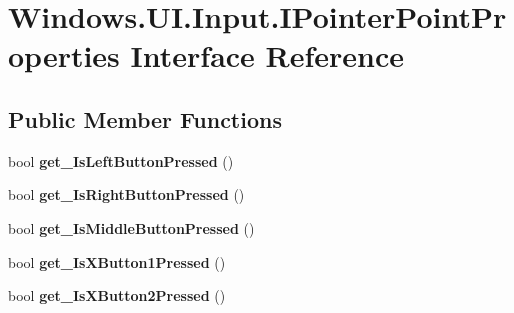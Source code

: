 \hypertarget{interface_windows_1_1_u_i_1_1_input_1_1_i_pointer_point_properties}{}\section{Windows.\+U\+I.\+Input.\+I\+Pointer\+Point\+Properties Interface Reference}
\label{interface_windows_1_1_u_i_1_1_input_1_1_i_pointer_point_properties}
\subsection*{Public Member Functions}
\begin{DoxyCompactItemize}
\item 
\mbox{\label{interface_windows_1_1_u_i_1_1_input_1_1_i_pointer_point_properties_a1ca5f10e1d25ff33cc254dc1d0f6cf69}} 
bool {\bfseries get\+\_\+\+Is\+Left\+Button\+Pressed} ()
\item 
\mbox{\label{interface_windows_1_1_u_i_1_1_input_1_1_i_pointer_point_properties_a7a5704ae1d4560e59d7cf16c92a4cecd}} 
bool {\bfseries get\+\_\+\+Is\+Right\+Button\+Pressed} ()
\item 
\mbox{\label{interface_windows_1_1_u_i_1_1_input_1_1_i_pointer_point_properties_a6748f610eb303e4885f2ed14bd3af467}} 
bool {\bfseries get\+\_\+\+Is\+Middle\+Button\+Pressed} ()
\item 
\mbox{\label{interface_windows_1_1_u_i_1_1_input_1_1_i_pointer_point_properties_a77bb8cdfb670e2a5709c5cdfe34130de}} 
bool {\bfseries get\+\_\+\+Is\+X\+Button1\+Pressed} ()
\item 
\mbox{\label{interface_windows_1_1_u_i_1_1_input_1_1_i_pointer_point_properties_aafb4fd9feb6c3b8cddf3c63dce966669}} 
bool {\bfseries get\+\_\+\+Is\+X\+Button2\+Pressed} ()
\item 
\mbox{\label{interface_windows_1_1_u_i_1_1_input_1_1_i_pointer_point_properties_a1ca5f10e1d25ff33cc254dc1d0f6cf69}} 

\end{DoxyCompactItemize}
